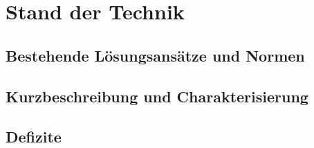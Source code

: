 \chapter{Stand der Technik}
\label{tb-stand-der-technik}

\section{Bestehende Lösungsansätze und Normen}


\section{Kurzbeschreibung und Charakterisierung}


\section{Defizite}

